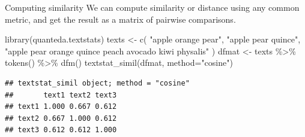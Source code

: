 \documentclass[
  10pt,
  ignorenonframetext,
  aspectratio=169]{beamer}
\newenvironment{Shaded}{\begin{snugshade}}{\end{snugshade}}
\newcommand{\AttributeTok}[1]{\textcolor[rgb]{0.80,0.80,0.80}{#1}}
\newcommand{\FunctionTok}[1]{\textcolor[rgb]{0.94,0.94,0.56}{#1}}
\newcommand{\NormalTok}[1]{\textcolor[rgb]{0.80,0.80,0.80}{#1}}
\newcommand{\OtherTok}[1]{\textcolor[rgb]{0.94,0.94,0.56}{#1}}
\newcommand{\SpecialCharTok}[1]{\textcolor[rgb]{0.86,0.64,0.64}{#1}}
\newcommand{\StringTok}[1]{\textcolor[rgb]{0.80,0.58,0.58}{#1}}
\begin{document}
\begin{frame}[fragile]{Computing similarity}
\protect\hypertarget{computing-similarity}{}
We can compute similarity or distance using any common metric, and get
the result as a matrix of pairwise comparisons.

\scriptsize

\begin{Shaded}
\begin{Highlighting}[]
\FunctionTok{library}\NormalTok{(quanteda.textstats)}
\NormalTok{texts }\OtherTok{\textless{}{-}} \FunctionTok{c}\NormalTok{(}
  \StringTok{"apple orange pear"}\NormalTok{, }\StringTok{"apple pear quince"}\NormalTok{,}
  \StringTok{"apple pear orange quince peach avocado kiwi physalis"}
\NormalTok{)}
\NormalTok{dfmat }\OtherTok{\textless{}{-}}\NormalTok{ texts }\SpecialCharTok{\%\textgreater{}\%} \FunctionTok{tokens}\NormalTok{() }\SpecialCharTok{\%\textgreater{}\%} \FunctionTok{dfm}\NormalTok{()}
\FunctionTok{textstat\_simil}\NormalTok{(dfmat, }\AttributeTok{method=}\StringTok{"cosine"}\NormalTok{)}
\end{Highlighting}
\end{Shaded}

\begin{verbatim}
## textstat_simil object; method = "cosine"
##       text1 text2 text3
## text1 1.000 0.667 0.612
## text2 0.667 1.000 0.612
## text3 0.612 0.612 1.000
\end{verbatim}
\end{frame}
\end{document}
